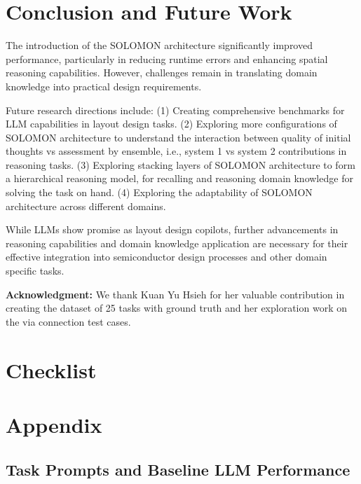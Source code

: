 \documentclass{article}
\begin{document}
\section{Conclusion and Future Work}
The introduction of the SOLOMON architecture significantly improved performance, particularly in reducing runtime errors and enhancing spatial reasoning capabilities. However, challenges remain in translating domain knowledge into practical design requirements.

Future research directions include:
(1) Creating comprehensive benchmarks for LLM capabilities in layout design tasks.
(2) Exploring more configurations of SOLOMON architecture to understand the interaction between quality of initial thoughts vs assessment by ensemble, i.e., system 1 vs system 2 contributions in reasoning tasks.
(3) Exploring stacking layers of SOLOMON architecture to form a hierarchical reasoning model, for recalling and reasoning domain knowledge for solving the task on hand.
(4) Exploring the adaptability of SOLOMON architecture across different domains.

While LLMs show promise as layout design copilots, further advancements in reasoning capabilities and domain knowledge application are necessary for their effective integration into semiconductor design processes and other domain specific tasks.

\textbf{Acknowledgment:} We thank Kuan Yu Hsieh for her valuable contribution in creating the dataset of 25 tasks with ground truth and her exploration work on the via connection test cases.




\newpage
\section*{Checklist}



\newpage
\appendix

\section{Appendix}
\subsection{Task Prompts and Baseline LLM Performance}
\label{appendix:task_prompts_and_performance}
\end{document}
